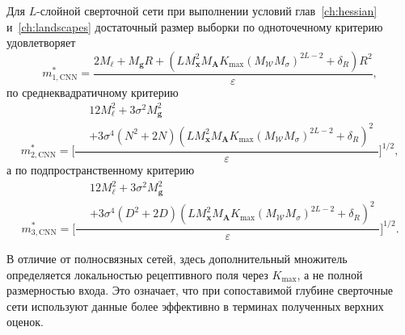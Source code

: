 \begin{corollary}
    \label{cor:scaling-cnn-sizes}
    Для $L$-слойной сверточной сети при выполнении условий глав~\ref{ch:hessian} и~\ref{ch:landscapes} достаточный размер выборки по одноточечному критерию удовлетворяет
    \begin{equation}
        \label{eq:scaling-cnn-m1}
        m_{1, \mathrm{CNN}}^*
        =
        \frac{
            2M_{\ell}
            +
            M_{\mathbf g}R
            +
            \left(
                L M_{\mathbf x}^2 M_{\mathbf A}K_{\max}(M_{\mathcal W}M_{\sigma})^{2L-2}
                +\delta_R
            \right)R^2
        }{\varepsilon},
    \end{equation}
    по среднеквадратичному критерию
    \begin{equation}
        \label{eq:scaling-cnn-m2}
        m_{2, \mathrm{CNN}}^*
        =
        \Bigg[
            \frac{
                \begin{aligned}
                &12M_{\ell}^2 + 3\sigma^2 M_{\mathbf g}^2 \\
                &+ 3\sigma^4(N^2+2N)
                \left(
                    L M_{\mathbf x}^2 M_{\mathbf A}K_{\max}(M_{\mathcal W}M_{\sigma})^{2L-2}
                    +\delta_R
                \right)^2
                \end{aligned}
            }{\varepsilon}
        \Bigg]^{1/2},
    \end{equation}
    а по подпространственному критерию
    \begin{equation}
        \label{eq:scaling-cnn-m3}
        m_{3, \mathrm{CNN}}^*
        =
        \Bigg[
            \frac{
                \begin{aligned}
                &12M_{\ell}^2 + 3\sigma^2 M_{\mathbf g}^2 \\
                &+ 3\sigma^4(D^2+2D)
                \left(
                    L M_{\mathbf x}^2 M_{\mathbf A}K_{\max}(M_{\mathcal W}M_{\sigma})^{2L-2}
                    +\delta_R
                \right)^2
                \end{aligned}
            }{\varepsilon}
        \Bigg]^{1/2}.
    \end{equation}
\end{corollary}

В отличие от полносвязных сетей, здесь дополнительный множитель определяется локальностью рецептивного поля через $K_{\max}$, а не полной размерностью входа. Это означает, что при сопоставимой глубине сверточные сети используют данные более эффективно в терминах полученных верхних оценок.

